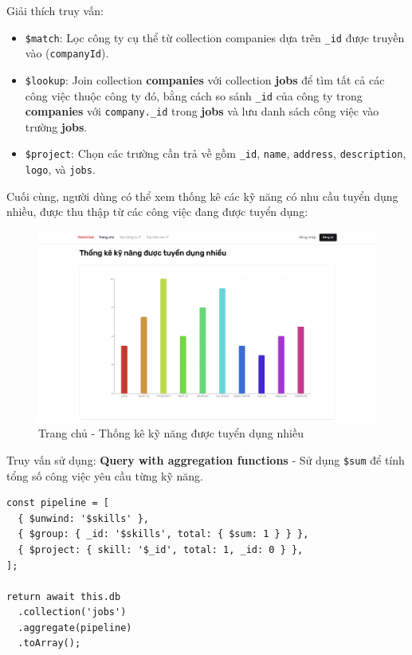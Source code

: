 Giải thích truy vấn:
\begin{itemize}
    \item \texttt{\$match}: Lọc công ty cụ thể từ collection companies dựa trên \texttt{\_id} được truyền vào (\texttt{companyId}).
    
    \item \texttt{\$lookup}: Join collection \textbf{companies} với collection \textbf{jobs} để tìm tất cả các công việc thuộc công ty đó, bằng cách so sánh \texttt{\_id} của công ty trong \textbf{companies} với \texttt{company.\_id} trong \textbf{jobs} và lưu danh sách công việc vào trường \textbf{jobs}.


    \item \texttt{\$project}: Chọn các trường cần trả về gồm \texttt{\_id}, \texttt{name}, \texttt{address}, \texttt{description}, \texttt{logo}, và \texttt{jobs}.
\end{itemize}

Cuối cùng, người dùng có thể xem thống kê các kỹ năng có nhu cầu tuyển dụng nhiều, được thu thập từ các công việc đang được tuyển dụng:

\begin{figure}[H]
    \centering
    \includegraphics[width=\linewidth]{DBMS-Application/Images/user-screen-skill-stats.png}
    \caption{Trang chủ - Thống kê kỹ năng được tuyển dụng nhiều}
    \label{fig:enter-label}
\end{figure}

Truy vấn sử dụng: \textbf{Query with aggregation functions} - Sử dụng \texttt{\$sum} để tính tổng số công việc yêu cầu từng kỹ năng.

\begin{lstlisting}
const pipeline = [
  { $unwind: '$skills' },
  { $group: { _id: '$skills', total: { $sum: 1 } } },
  { $project: { skill: '$_id', total: 1, _id: 0 } },
];

return await this.db
  .collection('jobs')
  .aggregate(pipeline)
  .toArray();
\end{lstlisting}

